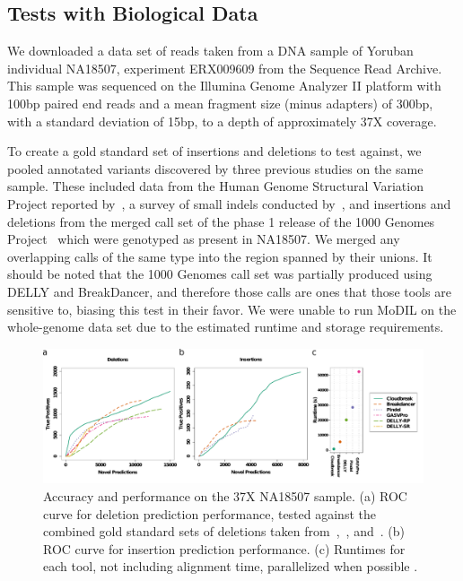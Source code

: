 \subsection{Tests with Biological Data}

We downloaded a data set of reads taken from a DNA sample of Yoruban individual NA18507, experiment ERX009609 from the Sequence Read Archive. This sample was sequenced on the Illumina Genome Analyzer II platform with 100bp paired end reads and a mean fragment size (minus adapters) of 300bp, with a standard deviation of 15bp, to a depth of approximately 37X coverage.

To create a gold standard set of insertions and deletions to test against, we pooled annotated variants discovered by three previous studies on the same sample. These included data from the Human Genome Structural Variation Project reported by~\cite{Kidd:2008p926}, a survey of small indels conducted by~\cite{Mills:2011fi}, and insertions and deletions from the merged call set of the phase 1 release of the 1000 Genomes Project~\cite{GenomesProjectConsortium:2012co} which were genotyped as present in NA18507. We merged any overlapping calls of the same type into the region spanned by their unions. It should be noted that the 1000 Genomes call set was partially produced using DELLY and BreakDancer, and therefore those calls are ones that those tools are sensitive to, biasing this test in their favor. We were unable to run MoDIL on the whole-genome data set due to the estimated runtime and storage requirements.

\begin{figure}
\centering
\includegraphics[width=1\textwidth]{figures/NA18507_rocs_runtime.pdf}
\caption{Accuracy and performance on the 37X NA18507 sample. (a) ROC curve for deletion prediction performance, tested against the combined gold standard sets of deletions taken from~\cite{Kidd:2008p926},~\cite{Mills:2011fi}, and~\cite{GenomesProjectConsortium:2012co}. (b) ROC curve for insertion prediction performance. (c) Runtimes for each tool, not including alignment time, parallelized when possible . }
\label{NA18507CombinedRoc}
\end{figure}

